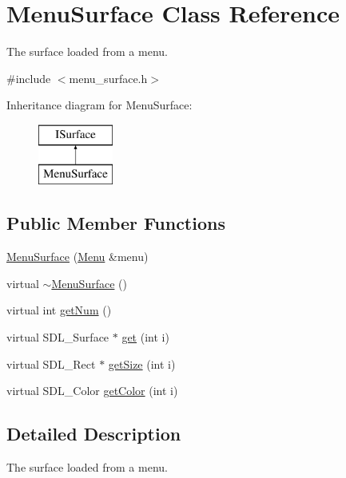 \hypertarget{class_menu_surface}{}\section{Menu\+Surface Class Reference}
\label{class_menu_surface}


The surface loaded from a menu.  




{\ttfamily \#include $<$menu\+\_\+surface.\+h$>$}

Inheritance diagram for Menu\+Surface\+:\begin{figure}[H]
\begin{center}
\leavevmode
\includegraphics[height=2.000000cm]{class_menu_surface}
\end{center}
\end{figure}
\subsection*{Public Member Functions}
\begin{DoxyCompactItemize}
\item 
\mbox{\hyperlink{class_menu_surface_a6eded782a5e3495e20f06194165f8792}{Menu\+Surface}} (\mbox{\hyperlink{class_menu}{Menu}} \&menu)
\item 
virtual \mbox{\hyperlink{class_menu_surface_a1659d1832a1406905f4217143da5ca4f}{$\sim$\+Menu\+Surface}} ()
\item 
virtual int \mbox{\hyperlink{class_menu_surface_a6533d04f9c2f57bfffb58d461070e61f}{get\+Num}} ()
\item 
virtual S\+D\+L\+\_\+\+Surface $\ast$ \mbox{\hyperlink{class_menu_surface_a450caa8462abbc0202e2242f1fdd0816}{get}} (int i)
\item 
virtual S\+D\+L\+\_\+\+Rect $\ast$ \mbox{\hyperlink{class_menu_surface_a80f484cceafba5c53ff4cf2b07db0c3b}{get\+Size}} (int i)
\item 
virtual S\+D\+L\+\_\+\+Color \mbox{\hyperlink{class_menu_surface_a2fa22cd43ecf4f0ca4749f7d95ca771a}{get\+Color}} (int i)
\end{DoxyCompactItemize}


\subsection{Detailed Description}
The surface loaded from a menu. 

